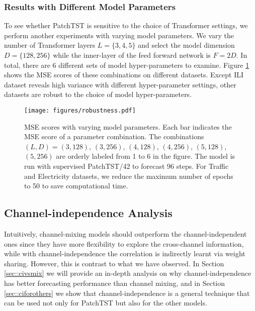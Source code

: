 \documentclass{article} \usepackage{iclr2023_conference,times}
\begin{document}
\subsubsection{Results with Different Model Parameters}

To see whether PatchTST is sensitive to the choice of Transformer settings, we perform another experiments with varying model parameters. We vary the number of Transformer layers $L=\{3,4,5\}$ and select the model dimension $D=\{128, 256\}$ while the inner-layer of the feed forward network is $F = 2D$. In total, there are 6 different sets of model hyper-parameters to examine. Figure \ref{fig::robustness} shows the MSE scores of these combinations on different datasets. Except ILI dataset reveals high variance with different hyper-parameter settings, other datasets are robust to the choice of model hyper-parameters. 


\begin{figure}[h]
\begin{center}
\texttt{[image: figures/robustness.pdf]}
\end{center}
\caption{MSE scores with varying model parameters. Each bar indicates the MSE score of a parameter combination. The combinations $(L, D) = (3,128)$, $(3,256)$, $(4,128)$, $(4,256)$, $(5,128)$, $(5,256)$ are orderly labeled from 1 to 6 in the figure. The model is run with supervised PatchTST/42 to forecast $96$ steps. For Traffic and Electricity datasets, we reduce the maximum number of epochs to 50 to save computational time.}
\label{fig::robustness}
\end{figure}


\subsection{Channel-independence Analysis}
\label{append::ci}

Intuitively, channel-mixing models should outperform the channel-independent ones since they have more flexibility to explore the cross-channel information, while with channel-independence the correlation is indirectly learnt via weight sharing. However, this is contrast to what we have observed. In Section \ref{sec::civsmix} we will provide an in-depth analysis on why channel-independence has better forecasting performance than channel mixing, and in Section \ref{sec::ciforothers} we show that channel-independence is a general technique that can be used not only for PatchTST but also for the other models. 
\end{document}
